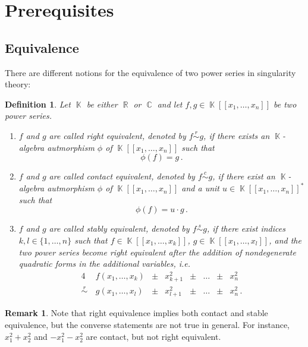 \documentclass[noend]{amsproc}
\newtheorem{defn}[theorem]{Definition}
\theoremstyle{definition}
\newtheorem{remark}[theorem]{Remark}
\newcommand{\requiv}{\ensuremath{\mathrel{\overset{r}{\sim}}}}
\newcommand{\cequiv}{\ensuremath{\mathrel{\overset{c}{\sim}}}}
\newcommand{\sequiv}{\ensuremath{\mathrel{\overset{s}{\sim}}}}
\DeclareMathOperator{\R}{\mathbb{R}}
\DeclareMathOperator{\C}{\mathbb{C}}
\DeclareMathOperator{\K}{\mathbb{K}}
\begin{document}
\section{Prerequisites}%
\label{sec:prerequisites}

\subsection{Equivalence}%
\label{subsec:equivalence}

There are different notions for the equivalence of two power series in
singularity theory:

\begin{defn}%
\label{def:equivalence}
Let $\K$ be either $\R$ or $\C$ and let $f, g \in \K[[x_1, \ldots, x_n]]$ be
two power series.

\begin{enumerate}
\item
$f$ and $g$ are called \emph{right equivalent}, denoted by $f \requiv g$, if
there exists an $\K$-algebra autmorphism $\phi$ of $\K[[x_1, \ldots, x_n]]$
such that
\[
\phi(f) = g \,.
\]

\item
$f$ and $g$ are called \emph{contact equivalent}, denoted by $f \cequiv g$, if
there exist an $\K$-algebra autmorphism $\phi$ of $\K[[x_1, \ldots, x_n]]$ and
a unit $u \in \K[[x_1, \ldots, x_n]]^*$ such that
\[
\phi(f) = u \cdot g \,.
\]

\item\label{enum:stable_equivalence}
$f$ and $g$ are called \emph{stably equivalent}, denoted by $f \sequiv g$, if
there exist indices $k, l \in \{1, \ldots ,n\}$ such that
$f \in \K[[x_1, \ldots, x_k]]$, $g \in \K[[x_1, \ldots, x_l]]$, and the two
power series become right equivalent after the addition of nondegenerate
quadratic forms in the additional variables, i.e.
\begin{alignat*}{4}
& f(x_1, \ldots, x_k) &{}\pm{}& x_{k+1}^2 &{}\pm{}& \ldots &{}\pm{}& x_n^2 \\
\requiv{} \,
& g(x_1, \ldots, x_l) &{}\pm{}& x_{l+1}^2 &{}\pm{}& \ldots &{}\pm{}& x_n^2 \,.
\end{alignat*}
\end{enumerate}
\end{defn}

\begin{remark}
Note that right equivalence implies both contact and stable equivalence, but
the converse statements are not true in general. For instance, $x_1^2+x_2^2$
and $-x_1^2-x_2^2$ are contact, but not right equivalent.
\end{remark}
\end{document}
